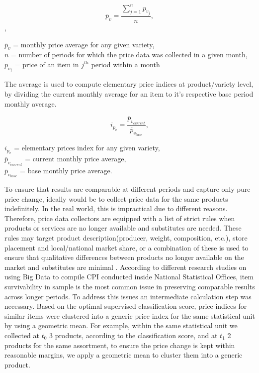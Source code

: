 \documentclass[]{article}
\begin{document}
\begin{equation}\label{eq:1}
\overline{p}_{v} = \frac{\sum_{j=1}^n {p_{v_{j}}}}{n} ,
\end{equation} ,

\begin{center} 
	$\overline{p}_{v}$ = monthly price average for any given variety, \\
	$n$ = number of periods for which the price data was collected in a given month, \\
	$p_{v_{j}}$ = price of an item in $j^{th}$ period within a month
\end{center}

The average is used to compute elementary 
price indices at product/variety level, by dividing the current monthly average for an item to it's respective base period monthly average. 

\begin{equation}\label{eq:2}
i_{p_{v}} = \frac{\overline{p}_{v_{current}}}{\overline{p}_{v_{base}}} ,
\end{equation}

\begin{center}	
	$i_{p_{v}}$ = elementary prices index for any given variety, \\
	$\overline{p}_{v_{current}}$ = current monthly price average, \\
	$\overline{p}_{v_{base}}$ = base monthly price average.
\end{center} 

To ensure that results are comparable at different periods and capture only pure price change, ideally would be to collect price data for the same products indefinitely\cite{cpi2}. In the real world, this is impractical due to different reasons. Therefore, price data collectors are equipped with a list of strict rules when products or services are no longer available and substitutes are needed. These rules may target product description(producer, weight, composition, etc.), store placement and local/national market share, or a combination of these is used to ensure that qualitative differences between products no longer available on the market and substitutes are minimal \cite{cpi}. According to different research studies on using Big Data to compile CPI conducted inside National Statistical Offices, item survivability in sample is the most common issue in preserving comparable results across longer periods\cite{ons2017, willenborg2017, tranzitivity, kints}. To address this issues an intermediate calculation step was necessary. Based on the optimal supervised classification score, price indices for similar items were clustered into a generic price index for the same statistical unit by using a geometric mean. For example, within the same statistical unit we collected at $t_{0}$ 3 products, according to the classification score, and at $t_{1}$ 2 products for the same assortment, to ensure the price change is kept within reasonable margins, we apply a geometric mean to cluster them into a generic product.   
\end{document}
